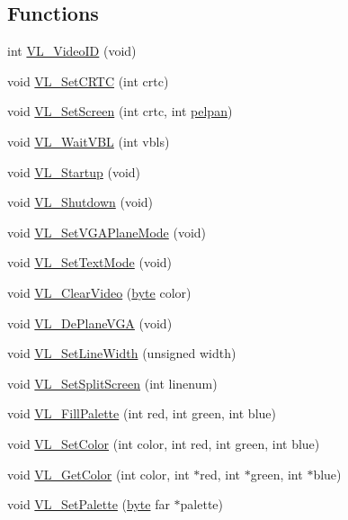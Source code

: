 \subsection*{Functions}
\begin{DoxyCompactItemize}
\item 
int \hyperlink{ID__VL_8C_a3304fe571736f2ede98f223788d51091}{VL\_\-VideoID} (void)
\item 
void \hyperlink{ID__VL_8C_a89e081d78ddb442fccb756b63b32db7e}{VL\_\-SetCRTC} (int crtc)
\item 
void \hyperlink{ID__VL_8C_a3de4b44b45163a1efd172c1ac4153a56}{VL\_\-SetScreen} (int crtc, int \hyperlink{ID__VL_8H_a868e53c86d5ef1ddae46b80290a36cd8}{pelpan})
\item 
void \hyperlink{ID__VL_8C_ab76cfea15c66ecd888aa773a7b5ec300}{VL\_\-WaitVBL} (int vbls)
\item 
void \hyperlink{ID__VL_8C_aa10dcb97ab8ddbe00ceff643af423bef}{VL\_\-Startup} (void)
\item 
void \hyperlink{ID__VL_8C_a138484024a3c6a70dd3f3fc8b0774aa9}{VL\_\-Shutdown} (void)
\item 
void \hyperlink{ID__VL_8C_a49a6717be931b39c40a299c8e6383d82}{VL\_\-SetVGAPlaneMode} (void)
\item 
void \hyperlink{ID__VL_8C_a709f71c569d3ac193681be08c072085b}{VL\_\-SetTextMode} (void)
\item 
void \hyperlink{ID__VL_8C_a82e5109ec5af48b755563a47b8760160}{VL\_\-ClearVideo} (\hyperlink{ID__HEAD_8H_a0c8186d9b9b7880309c27230bbb5e69d}{byte} color)
\item 
void \hyperlink{ID__VL_8C_a324bc865f0f44dda58c10ada4eae8bb5}{VL\_\-DePlaneVGA} (void)
\item 
void \hyperlink{ID__VL_8C_ae6999c2347a63aecb0d5b773727233e4}{VL\_\-SetLineWidth} (unsigned width)
\item 
void \hyperlink{ID__VL_8C_aead87cc222e7ecc11ed285babd9df96f}{VL\_\-SetSplitScreen} (int linenum)
\item 
void \hyperlink{ID__VL_8C_a5b35f17b2827ed46e5527e980de6522d}{VL\_\-FillPalette} (int red, int green, int blue)
\item 
void \hyperlink{ID__VL_8C_a58b95eb8953ab9a02185e8fec86ca80e}{VL\_\-SetColor} (int color, int red, int green, int blue)
\item 
void \hyperlink{ID__VL_8C_aac86ea12ff7436142d995dd219146b7a}{VL\_\-GetColor} (int color, int $\ast$red, int $\ast$green, int $\ast$blue)
\item 
void \hyperlink{ID__VL_8C_ae2508644c57749de78a11a9122a36157}{VL\_\-SetPalette} (\hyperlink{ID__HEAD_8H_a0c8186d9b9b7880309c27230bbb5e69d}{byte} far $\ast$palette)

\end{DoxyCompactItemize}
